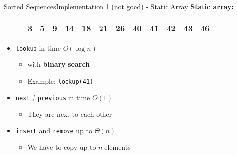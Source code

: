 \begin{frame}{Sorted Sequences}{Implementation 1 (not good) - Static Array}
  \textbf{Static array:}
    \begin{figure}[!b]
    \begin{tabular}{|c|c|c|c|c|c|c|c|c|c|c|c|}
      \hline
      3 & 5 & 9 & 14 & 18 & 21 & 26 & 40 & 41 & 42 & 43 & 46\\
      \hline
    \end{tabular}
    \label{fig:sorted_collections:impl_static_array}
  \end{figure}
  \begin{itemize}
    \item<2->
      {\color{Mittel-Blau}\texttt{lookup}} in time \texttt{$O(\log n)$}
      \begin{itemize}
        \item<3-> with \textbf{binary search}
        \item<4->
          Example: {\color{Mittel-Blau}\texttt{lookup(41)}}
      \end{itemize}
    \item<5->
      {\color{Mittel-Blau}\texttt{next}} /
      {\color{Mittel-Blau}\texttt{previous}} in time $O(1)$
      \begin{itemize}
        \item<6-> They are next to each other
      \end{itemize}
    \item<7->
      {\color{Mittel-Blau}\texttt{insert}} and
      {\color{Mittel-Blau}\texttt{remove}} up to $\Theta(n)$\\
      \begin{itemize}
        \item<8-> We have to copy up to $n$ elements
      \end{itemize}
  \end{itemize}
\end{frame}



